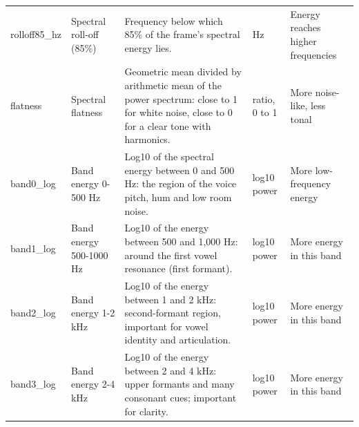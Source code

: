 \documentclass[11pt,a4paper]{article}
\begin{document}
\begin{center}
\begin{longtable}{>{\raggedright\arraybackslash}p{2.14cm}>{\raggedright\arraybackslash}p{2.23cm}>{\raggedright\arraybackslash}p{5.95cm}>{\raggedright\arraybackslash}p{1.67cm}>{\raggedright\arraybackslash}p{2.42cm}}
\hspace{0pt}rolloff85\_\allowbreak{}hz & \hspace{0pt}Spectral roll-off (85\%) & \hspace{0pt}Frequency below which 85\% of the frame's spectral energy lies. & \hspace{0pt}Hz & \hspace{0pt}Energy reaches higher frequencies\\
\hspace{0pt}flatness & \hspace{0pt}Spectral flatness & \hspace{0pt}Geometric mean divided by arithmetic mean of the power spectrum: close to 1 for white noise, close to 0 for a clear tone with harmonics. & \hspace{0pt}ratio, 0 to 1 & \hspace{0pt}More noise-like, less tonal\\
\hspace{0pt}band0\_\allowbreak{}log & \hspace{0pt}Band energy 0-500 Hz & \hspace{0pt}Log10 of the spectral energy between 0 and 500 Hz: the region of the voice pitch, hum and low room noise. & \hspace{0pt}log10 power & \hspace{0pt}More low-frequency energy\\
\hspace{0pt}band1\_\allowbreak{}log & \hspace{0pt}Band energy 500-1000 Hz & \hspace{0pt}Log10 of the energy between 500 and 1,000 Hz: around the first vowel resonance (first formant). & \hspace{0pt}log10 power & \hspace{0pt}More energy in this band\\
\hspace{0pt}band2\_\allowbreak{}log & \hspace{0pt}Band energy 1-2 kHz & \hspace{0pt}Log10 of the energy between 1 and 2 kHz: second-formant region, important for vowel identity and articulation. & \hspace{0pt}log10 power & \hspace{0pt}More energy in this band\\
\hspace{0pt}band3\_\allowbreak{}log & \hspace{0pt}Band energy 2-4 kHz & \hspace{0pt}Log10 of the energy between 2 and 4 kHz: upper formants and many consonant cues; important for clarity. & \hspace{0pt}log10 power & \hspace{0pt}More energy in this band\\

\end{longtable}
\end{center}
\end{document}
